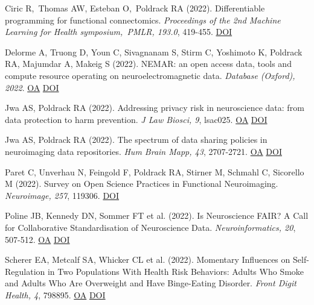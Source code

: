 \documentclass[10pt, letterpaper]{article}
\begin{document}
Ciric R, Thomas AW, Esteban O, Poldrack RA (2022). Differentiable programming for functional connectomics. \textit{Proceedings of the 2nd Machine Learning for Health symposium, PMLR, 193.0}, 419-455. \href{http://dx.doi.org/None}{DOI} \vspace{2mm}

Delorme A, Truong D, Youn C, Sivagnanam S, Stirm C, Yoshimoto K, Poldrack RA, Majumdar A, Makeig S (2022). NEMAR: an open access data, tools and compute resource operating on neuroelectromagnetic data. \textit{Database (Oxford), 2022}. \href{https://www.ncbi.nlm.nih.gov/pmc/articles/PMC9650770}{OA} \href{http://dx.doi.org/10.1093/database/baac096}{DOI} \vspace{2mm}

Jwa AS, Poldrack RA (2022). Addressing privacy risk in neuroscience data: from data protection to harm prevention. \textit{J Law Biosci, 9}, lsac025. \href{https://www.ncbi.nlm.nih.gov/pmc/articles/PMC9444136}{OA} \href{http://dx.doi.org/10.1093/jlb/lsac025}{DOI} \vspace{2mm}

Jwa AS, Poldrack RA (2022). The spectrum of data sharing policies in neuroimaging data repositories. \textit{Hum Brain Mapp, 43}, 2707-2721. \href{https://www.ncbi.nlm.nih.gov/pmc/articles/PMC9057092}{OA} \href{http://dx.doi.org/10.1002/hbm.25803}{DOI} \vspace{2mm}

Paret C, Unverhau N, Feingold F, Poldrack RA, Stirner M, Schmahl C, Sicorello M (2022). Survey on Open Science Practices in Functional Neuroimaging. \textit{Neuroimage, 257}, 119306. \href{http://dx.doi.org/10.1016/j.neuroimage.2022.119306}{DOI} \vspace{2mm}

Poline JB, Kennedy DN, Sommer FT et al. (2022). Is Neuroscience FAIR? A Call for Collaborative Standardisation of Neuroscience Data. \textit{Neuroinformatics, 20}, 507-512. \href{https://www.ncbi.nlm.nih.gov/pmc/articles/PMC9300762}{OA} \href{http://dx.doi.org/10.1007/s12021-021-09557-0}{DOI} \vspace{2mm}

Scherer EA, Metcalf SA, Whicker CL et al. (2022). Momentary Influences on Self-Regulation in Two Populations With Health Risk Behaviors: Adults Who Smoke and Adults Who Are Overweight and Have Binge-Eating Disorder. \textit{Front Digit Health, 4}, 798895. \href{https://www.ncbi.nlm.nih.gov/pmc/articles/PMC8971561}{OA} \href{http://dx.doi.org/10.3389/fdgth.2022.798895}{DOI} \vspace{2mm}
\end{document}
